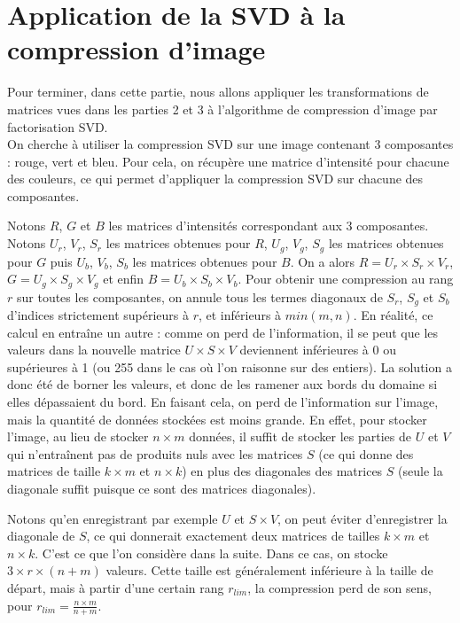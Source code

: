 \section{Application de la SVD à la compression d'image}
Pour terminer, dans cette partie, nous allons appliquer les transformations de matrices vues dans les parties 2 et 3 à 
l'algorithme de compression d'image par factorisation SVD.\\

On cherche à utiliser la compression SVD sur une image contenant 3 composantes : rouge, vert et bleu.
Pour cela, on récupère une matrice d'intensité pour chacune des couleurs, ce qui permet d'appliquer la compression SVD sur chacune des composantes.

Notons $R$, $G$ et $B$ les matrices d'intensités correspondant aux 3 composantes.
Notons $U_r$, $V_r$, $S_r$ les matrices obtenues pour $R$,
$U_g$, $V_g$, $S_g$ les matrices obtenues pour $G$ puis
$U_b$, $V_b$, $S_b$ les matrices obtenues pour $B$.
On a alors $R = U_r \times S_r \times V_r$, $G = U_g \times S_g \times V_g$ et enfin
$B = U_b \times S_b \times V_b$.
\bigbreak
Pour obtenir une compression au rang $r$ sur toutes les composantes, 
on annule tous les termes diagonaux de $S_r$, $S_g$ et $S_b$ d'indices 
strictement supérieurs à $r$, et inférieurs à $min(m, n)$.
En réalité, ce calcul en entraîne un autre : comme on perd de l'information, il se peut que les valeurs dans la nouvelle matrice $U \times S \times V$ deviennent inférieures à 0 ou supérieures à 1 
(ou 255 dans le cas où l'on raisonne sur des entiers).
La solution a donc été de borner les valeurs, et donc de les ramener aux bords du domaine si elles dépassaient du bord.
\bigbreak
En faisant cela, on perd de l'information sur l'image, mais la quantité de données stockées est moins grande.
En effet, pour stocker l'image, au lieu de stocker $n \times m$ données, il suffit de stocker 
les parties de $U$ et $V$ qui n'entraînent pas de produits nuls avec les matrices $S$ (ce qui donne des matrices de taille $k \times m$ et $n \times k$)
en plus des diagonales des matrices $S$ (seule la diagonale suffit puisque ce sont des matrices diagonales).

Notons qu'en enregistrant par exemple $U$ et $S \times V$, on peut éviter d'enregistrer la diagonale de $S$, ce qui donnerait exactement deux matrices de tailles $k \times m$ et $n \times k$.
C'est ce que l'on considère dans la suite.
Dans ce cas, on stocke $3 \times r \times (n + m)$ valeurs.
Cette taille est généralement inférieure à la taille de départ, mais à partir d'une certain rang $r_{lim}$, la compression perd de son sens, pour $r_{lim} = \frac{n \times m}{n + m}$.
\bigbreak

